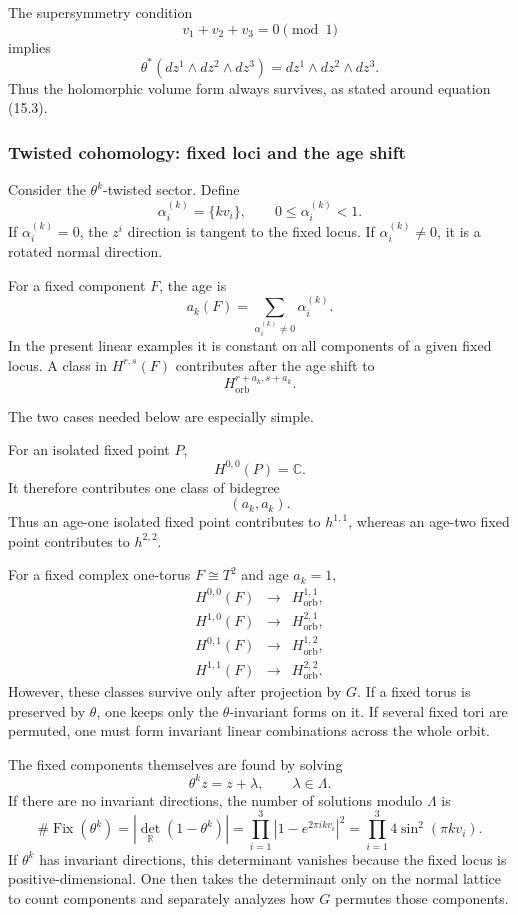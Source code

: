 \documentclass[
  10pt,
  a4paper,
  openany]{book}
\begin{document}
The supersymmetry condition \[
v_1+v_2+v_3=0\pmod 1
\] implies \[
\theta^*
\left(dz^1\wedge dz^2\wedge dz^3\right)
=dz^1\wedge dz^2\wedge dz^3.
\] Thus the holomorphic volume form always survives, as stated around
equation (15.3).

\subsubsection{Twisted cohomology: fixed loci and the age
shift}\label{twisted-cohomology-fixed-loci-and-the-age-shift}

Consider the \(\theta^k\)-twisted sector. Define \[
\alpha_i^{(k)}=\{kv_i\},
\qquad
0\leq\alpha_i^{(k)}<1.
\] If \(\alpha_i^{(k)}=0\), the \(z^i\) direction is tangent to the
fixed locus. If \(\alpha_i^{(k)}\neq0\), it is a rotated normal
direction.

For a fixed component \(F\), the age is \[
a_k(F)
=
\sum_{\alpha_i^{(k)}\neq0}
\alpha_i^{(k)}.
\] In the present linear examples it is constant on all components of a
given fixed locus. A class in \(H^{r,s}(F)\) contributes after the age
shift to \[
H^{r+a_k,s+a_k}_{\mathrm{orb}}.
\]

The two cases needed below are especially simple.

For an isolated fixed point \(P\), \[
H^{0,0}(P)=\mathbb C.
\] It therefore contributes one class of bidegree \[
(a_k,a_k).
\] Thus an age-one isolated fixed point contributes to \(h^{1,1}\),
whereas an age-two fixed point contributes to \(h^{2,2}\).

For a fixed complex one-torus \(F\cong T^2\) and age \(a_k=1\), \[
\begin{array}{ccl}
H^{0,0}(F)&\longrightarrow&H_{\mathrm{orb}}^{1,1},\\
H^{1,0}(F)&\longrightarrow&H_{\mathrm{orb}}^{2,1},\\
H^{0,1}(F)&\longrightarrow&H_{\mathrm{orb}}^{1,2},\\
H^{1,1}(F)&\longrightarrow&H_{\mathrm{orb}}^{2,2}.
\end{array}
\] However, these classes survive only after projection by \(G\). If a
fixed torus is preserved by \(\theta\), one keeps only the
\(\theta\)-invariant forms on it. If several fixed tori are permuted,
one must form invariant linear combinations across the whole orbit.

The fixed components themselves are found by solving \[
\theta^k z=z+\lambda,
\qquad
\lambda\in\Lambda.
\] If there are no invariant directions, the number of solutions modulo
\(\Lambda\) is \[
\#\operatorname{Fix}(\theta^k)
=
\left|\det_{\mathbb R}(1-\theta^k)\right|
=
\prod_{i=1}^3
\left|1-e^{2\pi i k v_i}\right|^2
=
\prod_{i=1}^3
4\sin^2(\pi k v_i).
\] If \(\theta^k\) has invariant directions, this determinant vanishes
because the fixed locus is positive-dimensional. One then takes the
determinant only on the normal lattice to count components and
separately analyzes how \(G\) permutes those components.
\end{document}
